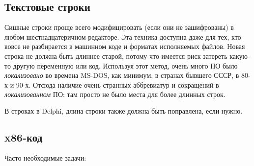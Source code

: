 
\subsection{Текстовые строки}

Сишные строки проще всего модифицировать (если они не зашифрованы) в любом шестнадцатеричном редакторе.
Эта техника доступна даже для тех, кто вовсе не разбирается в машинном коде и форматах исполняемых
файлов.
Новая строка не должна быть длиннее старой, потому что имеется риск затереть какую-то другую переменную
или код.
Используя этот метод, очень много ПО было \emph{локализовано} во времена MS-DOS, как минимум,
в странах бывшего СССР, в 80-х и 90-х.
Отсюда наличие очень странных аббревиатур и сокращений в \emph{локализованном} ПО: 
там просто не было места для более
длинных строк.

В строках в Delphi, длина строки также должна быть поправлена, если нужно.

\subsection{x86-код}
\label{x86_patching}

Часто необходимые задачи:

